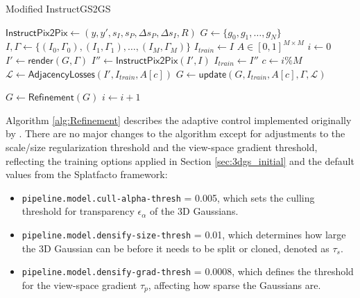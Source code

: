 \begin{algorithm}
	\caption{Modified InstructGS2GS} \label{alg:modified_InstructGS2GS}
	\begin{algorithmic}

		\State $\mathsf{InstructPix2Pix} \gets (y, y', s_I, s_P, \Delta s_P, \Delta s_I, R )$ 
		\State $G \gets \{g_0, g_1, \dots ,g_N\}$ 
		\State $I,\varGamma  \gets \{(I_0, \varGamma _0), (I_1, \varGamma _1), \dots, (I_M, \varGamma _M)\}$ 
		\State $I_{train} \gets I $ 
		\State $A \in [0,1]^{M \times M}$ 
		\State $i \gets 0$  
		  
		\State $I' \gets \mathsf{render}(G, \varGamma )$ 
		\State $I'' \gets \mathsf{InstructPix2Pix}(I', I)$ 
		\State $I_{train} \gets I'' $ 
		\EndIf
		\State $ c \gets i \% M$ 
		\State $\mathcal{L} \gets \mathsf{AdjacencyLosses}(I', I_{train}, A[c])  $ 
		\State $G \gets \mathsf{update}(G, I_{train}, A[c], \varGamma , \mathcal{L})$ 

		  
		\State $G \gets \mathsf{Refinement}(G)$ 
		\EndIf
		\State $i \gets i+1$

		\EndWhile\label{euclidendwhile}

	\end{algorithmic}
\end{algorithm}

Algorithm \ref{alg:Refinement} describes the adaptive control implemented originally by \textcite{Kerbl.2023}. There are no major changes to the algorithm except for adjustments to the scale/size regularization threshold and the view-space gradient threshold, reflecting the training options applied in Section \ref{sec:3dgs_initial} and the default values from the Splatfacto framework:

\begin{itemize}[noitemsep]
	\item \texttt{pipeline.model.cull-alpha-thresh} = 0.005, which sets the culling threshold for transparency $\epsilon_\alpha$ of the 3D Gaussians.
	\item \texttt{pipeline.model.densify-size-thresh} = 0.01, which determines how large the 3D Gaussian can be before it needs to be split or cloned, denoted as $\tau_s$.
	\item \texttt{pipeline.model.densify-grad-thresh} = 0.0008, which defines the threshold for the view-space gradient $\tau_{p}$, affecting how sparse the Gaussians are.
\end{itemize}

